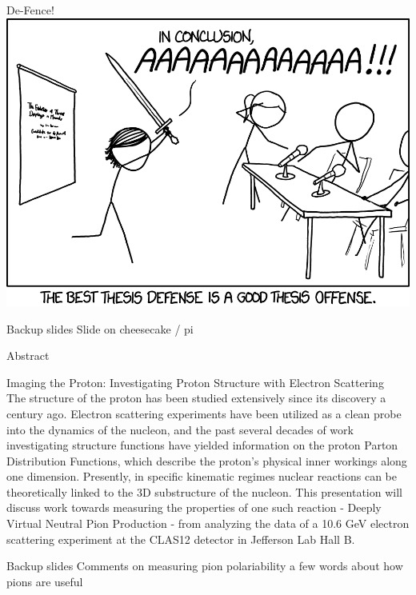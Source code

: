 \documentclass[aspectratio=169]{beamer}
\newcommand*{\myfont}{\fontfamily{lmtt}\selectfont}
\begin{document}
\begin{frame}{De-Fence!}
\centering
    \includegraphics[scale=0.5832]{Main/thesis_defense_2x.png}
    
    {\myfont{\tiny    https://xkcd.com/1403/   }}
\end{frame}


\begin{frame}{Backup slides}
\centering
Slide on cheesecake / pi
\end{frame}

\begin{frame}{Abstract}

Imaging the Proton: Investigating Proton Structure with Electron Scattering
\\
The structure of the proton has been studied extensively since its discovery a century ago.  Electron scattering experiments have been utilized as a clean probe into the dynamics of the nucleon, and the past several decades of work investigating structure functions have yielded information on the proton Parton Distribution Functions, which describe the proton's physical inner workings along one dimension. Presently, in specific kinematic regimes nuclear reactions can be theoretically linked to the 3D substructure of the nucleon. This presentation will discuss work towards measuring the properties of one such reaction - Deeply Virtual Neutral Pion Production - from analyzing the data of a 10.6 GeV electron scattering experiment at the CLAS12 detector in Jefferson Lab Hall B. 

\end{frame}


\begin{frame}{Backup slides}
Comments on measuring pion polariability
a few words about how pions are useful
\end{frame}
\end{document}
